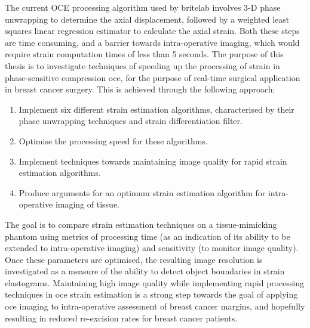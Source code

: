 The current OCE processing algorithm used by \ac{britelab} involves 3-D phase unwrapping to determine the axial displacement, followed by a weighted least squares linear regression estimator to calculate the axial strain. Both these steps are time consuming, and a barrier towards intra-operative imaging, which would require strain computation times of less than 5 seconds. The purpose of this thesis is to investigate techniques of speeding up the processing of strain in phase-sensitive compression \ac{oce}, for the purpose of real-time surgical application in breast cancer surgery. This is achieved through the following approach:
\begin{enumerate}
	\item Implement six different strain estimation algorithms, characterised by their phase unwrapping techniques and strain differentiation filter.
	\item Optimise the processing speed for these algorithms.
	\item Implement techniques towards maintaining image quality for rapid strain estimation algorithms.
	\item Produce arguments for an optimum strain estimation algorithm for intra-operative imaging of tissue.
\end{enumerate}
The goal is to compare strain estimation techniques on a tissue-mimicking phantom using metrics of processing time (as an indication of its ability to be extended to intra-operative imaging) and sensitivity (to monitor image quality). Once these parameters are optimised, the resulting image resolution is investigated as a measure of the ability to detect object boundaries in strain elastograms. Maintaining high image quality while implementing rapid processing techniques in \ac{oce} strain estimation is a strong step towards the goal of applying \ac{oce} imaging to intra-operative assessment of breast cancer margins, and hopefully resulting in reduced re-excision rates for breast cancer patients. 
